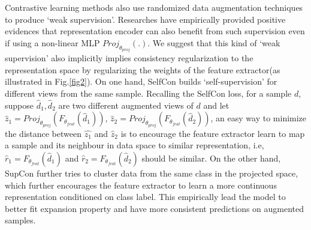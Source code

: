 \documentclass[letterpaper]{article} \usepackage{aaai22}  \usepackage{times}  \usepackage{helvet}  \usepackage{courier}  \usepackage[hyphens]{url}  \usepackage{graphicx} \usepackage{subfigure}
\begin{document}
Contrastive learning methods also use randomized data augmentation techniques to produce `weak supervision'. Researches have empirically provided positive evidences that representation encoder can also benefit from such supervision even if using a non-linear MLP $Proj_{\theta_{proj}}(.)$. We suggest that this kind of `weak supervision' also implicitly implies consistency regularization to the representation space by regularizing the weights of the feature extractor(as illustrated in Fig.\ref{fig2}). On one hand, SelfCon builds `self-supervision' for different views from the same sample. Recalling the SelfCon loss, for a sample $d$, suppose $\hat{d}_1, \hat{d}_2$ are two different augmented views of $d$ and let $\hat{z}_1= Proj_{\theta_{proj}}(F_{\theta_{feat}}(\hat{d}_1))$, $\hat{z}_2= Proj_{\theta_{proj}}(F_{\theta_{feat}}(\hat{d}_2))$, an easy way to minimize the distance between $\hat{z_1}$ and $\hat{z}_2$ is to encourage the feature extractor learn to map a sample and its neighbour in data space to similar representation, i.e, $\hat{r}_1 =F_{\theta_{feat}}(\hat{d}_1)$ and $\hat{r}_2=F_{\theta_{feat}}(\hat{d}_2)$ should be similar. On the other hand, SupCon further tries to cluster data from the same class in the projected space, which further encourages the feature extractor to learn a more continuous representation conditioned on class label. This empirically lead the model to better fit expansion property and have more consistent predictions on augmented samples. 
\end{document}
